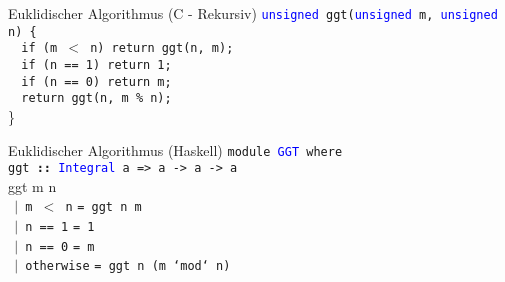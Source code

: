\documentclass[]{beamer}
\begin{document}
\begin{frame}[<+->][squeeze]{}
  \begin{exampleblock}{Euklidischer Algorithmus (C - Rekursiv)}
    \texttt{\textcolor{blue}{unsigned} ggt(\textcolor{blue}{unsigned} m, \textcolor{blue}{unsigned} n) \{ } \\
    \texttt{$\ \ $ if (m $<$ n) \hspace*{0.12em} return ggt(n, m);} \\
    \texttt{$\ \ $ if (n == 1) return 1;} \\
    \texttt{$\ \ $ if (n == 0) return m;} \\
    \texttt{$\ \ $ return ggt(n, m \% n);} \\
    \}
  \end{exampleblock}

  \begin{exampleblock}{Euklidischer Algorithmus (Haskell)}
    \texttt{module \textcolor{blue}{GGT} where} \\
    \vspace*{0.5em}
    \texttt{ggt \textbf{::} \textcolor{blue}{Integral} a => a -> a -> a} \\
    ggt m n \\
      \texttt{$\ \ |$ m $<$ n}   \hspace{22pt} \texttt{= ggt n m} \\
      \texttt{$\ \ |$ n == 1}    \hspace{19pt} \texttt{= 1} \\
      \texttt{$\ \ |$ n == 0}    \hspace{19pt} \texttt{= m} \\
      \texttt{$\ \ |$ otherwise} \hspace{2pt} \texttt{= ggt n (m `mod` n)}
  \end{exampleblock}
\end{frame}
\end{document}
